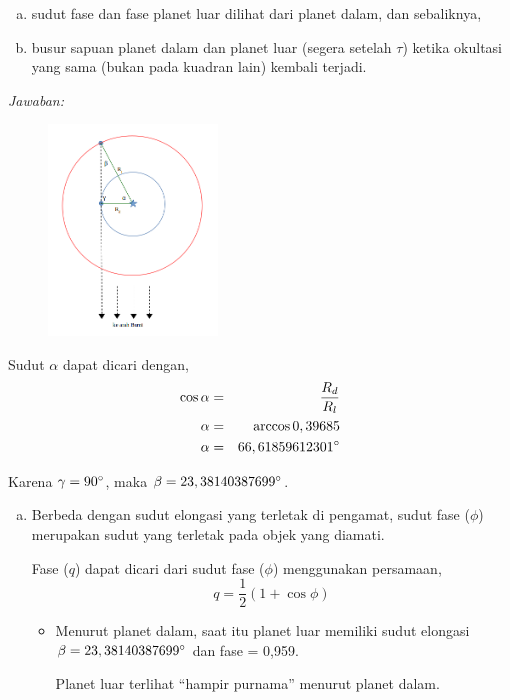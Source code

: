 \documentclass[11pt,fleqn]{exam}
\begin{document}
\begin{questions}
\begin{enumerate}[(a)]
\item sudut fase dan fase planet luar dilihat dari planet dalam, dan sebaliknya,
\item busur sapuan planet dalam dan planet luar (segera setelah $\tau$) ketika okultasi yang sama (bukan pada kuadran lain) kembali terjadi.\\
\end{enumerate}


\textit{Jawaban: } 

\begin{figure}[ht!]
\centering
\includegraphics[width=0.4\textwidth]{23.png}
\end{figure}

Sudut $\alpha$ dapat dicari dengan,
\begin{eqnarray*}
\cos{\alpha} &=& \frac{R_{d}}{R_{l}}\\
\alpha &=& \arccos{0,39685}\\
\alpha &=& 66,61859612301\degree
\end{eqnarray*}

Karena $\gamma = 90\degree$, maka $\beta = 23,38140387699\degree$.

\begin{enumerate}[a)]
\item Berbeda dengan sudut elongasi yang terletak di pengamat, sudut fase ($\phi$) merupakan sudut yang terletak pada objek yang diamati. 

Fase ($q$) dapat dicari dari sudut fase ($\phi$) menggunakan persamaan,
$$q = \frac{1}{2} ( 1 + \cos{\phi})$$

\begin{itemize}
\item Menurut planet dalam, saat itu planet luar memiliki sudut elongasi $\beta = 23,38140387699\degree$ dan fase = 0,959. 

Planet luar terlihat ``hampir purnama'' menurut planet dalam.


\end{itemize}
\end{enumerate}
\end{questions}
\end{document}
